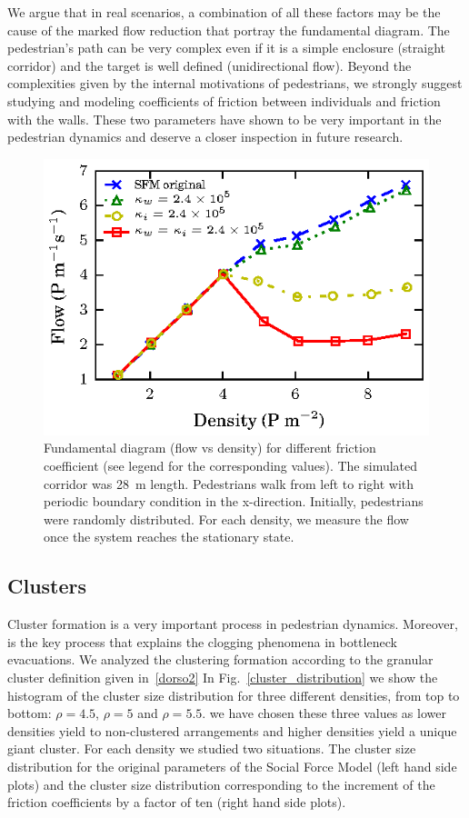 We argue that in real scenarios, a combination of all these factors may be the cause of the marked flow reduction that portray the fundamental diagram. The pedestrian's path can be very complex even if it is a simple enclosure (straight corridor) and the target is well defined (unidirectional flow). Beyond the complexities given by the internal motivations of pedestrians, we strongly suggest studying and modeling coefficients of friction between individuals and friction with the walls. These two parameters have shown to be very important in the pedestrian dynamics and deserve a closer inspection in future research. 


\begin{figure}[htbp!]
\includegraphics[width=\columnwidth]
{plots/flow-density_pasillo22m_fgmodified_multi.eps}
\caption{\label{fgmodified-w22} Fundamental diagram (flow vs density) for different friction coefficient (see legend for the corresponding values). The simulated corridor was 28~m length. Pedestrians walk from left to right with periodic boundary condition in the x-direction. Initially, pedestrians were randomly distributed. For each density, we measure the flow once the system reaches the stationary state.}
\end{figure}


\subsection{\label{clusters}Clusters}

Cluster formation is a very important process in pedestrian dynamics. Moreover, is the key process that explains the clogging phenomena in bottleneck evacuations. We analyzed the clustering formation according to the granular cluster definition given in~\ref{dorso2}
In Fig.~\ref{cluster_distribution} we show the histogram of the cluster size distribution for three different densities, from top to bottom: $\rho=4.5$, $\rho=5$ and $\rho=5.5$. we have chosen these three values as lower densities yield to non-clustered arrangements and higher densities yield a unique giant cluster.     
For each density we studied two situations. The cluster size distribution for the original parameters of the Social Force Model (left hand side plots) and the cluster size distribution corresponding to the increment of the friction coefficients by a factor of ten (right hand side plots).

